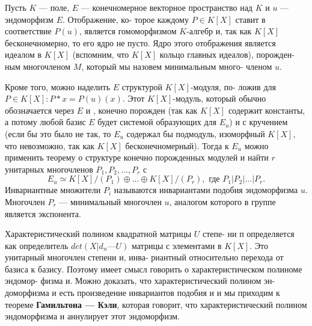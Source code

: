 \begin{mynotice}
Пусть $K$ — поле, $E$ — конечномерное векторное\linebreak
пространство над $K$ и $u$ — эндоморфизм $E$. Отображение, ко­-\linebreak
торое каждому $P \in K[X]$ ставит в соответствие $P(u)$, является\linebreak
гомоморфизмом $K$-алгебр и, так как $K[X]$ бесконечномерно, то\linebreak
его ядро не пусто. Ядро этого отображения является идеалом в\linebreak
$K[X]$ (вспомним, что $K[X]$ кольцо главных идеалов), порожден­-\linebreak
ным многочленом $M$, который мы назовем минимальным много­-\linebreak
членом $u$.

Кроме того, можно наделить $E$ структурой $K[X]$-модуля, по­-\linebreak
ложив для $P \in K[X]: P*x = P(u)(x)$. Этот $K[X]$-модуль, который\linebreak
обычно обозначается через $E$ и , конечно порожден (так как $K[X]$\linebreak
содержит константы, а потому любой базис $E$ будет системой\linebreak
образующих для $E_u$) и с кручением (если бы это было не так, то\linebreak
$E_u$ содержал бы подмодуль, изоморфный $K[X]$, что невозможно,\linebreak
так как $K[X]$ бесконечномерный). Тогда к $E_u$ можно применить\linebreak
теорему о структуре конечно порожденных модулей и найти $r$\linebreak
унитарных многочленов $P_1,P_2,...,P_r$ с
$$E_u \simeq K[X]/(P_1) \oplus...\oplus K[X]/(P_r), \text{ где } P_1 | P_2 | ... | P_r.$$
\newpage
\noindent Инвариантные множители $P_i$ называются инвариантами подо­бия\linebreak
 эндоморфизма $u$. Многочлен $P_r$ --- минимальный многочлен\linebreak
$u$, аналогом которого в группе является экспонента.

Характеристический полином квадратной матрицы $U$ степе­-\linebreak
ни п определяется как определитель $det(X|d_n — U)$ матрицы с\linebreak
элементами в $K[X]$. Это унитарный многочлен степени и, инва­-\linebreak
риантный относительно перехода от базиса к базису. Поэтому\linebreak
имеет смысл говорить о характеристическом полиноме эндомор­-\linebreak
физма и. Можно доказать, что характеристический полином эн­-\linebreak
доморфизма и есть произведение инвариантов подобия и и мы\linebreak
приходим к теореме \textbf{Гамильтона — Кэли}, которая говорит,\linebreak
что характеристический полином эндоморфизма и аннулирует\linebreak
этот эндоморфизм.


\end{mynotice}
